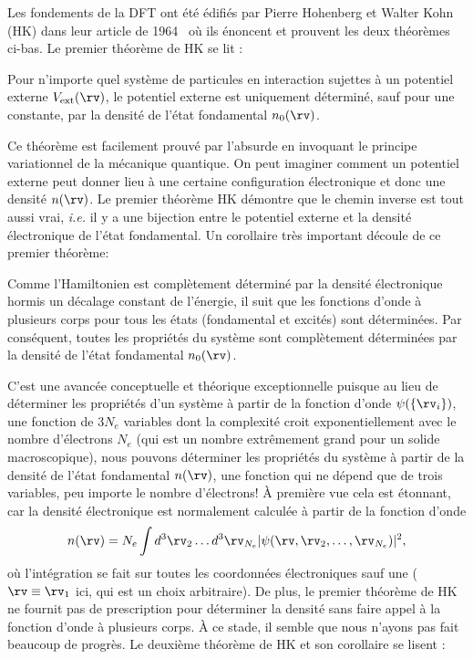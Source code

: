 Les fondements de la DFT ont été édifiés par Pierre Hohenberg et Walter Kohn (HK) dans leur article de 1964~\cite{hohenbergInhomogeneousElectronGas1964} où ils énoncent et prouvent les deux théorèmes ci-bas. Le premier théorème de HK se lit : 
\begin{theo}
    \label{thm:hk1}
    Pour n'importe quel système de particules en interaction sujettes à un potentiel externe $V_\text{ext}(\rv)$, le potentiel externe est uniquement déterminé, sauf pour une constante, par la densité de l'état fondamental $n_0(\rv)$.
\end{theo}
\noindent
Ce théorème est facilement prouvé par l'absurde en invoquant le principe variationnel de la mécanique quantique. On peut imaginer comment un potentiel externe peut donner lieu à une certaine configuration électronique et donc une densité $n(\rv)$. Le premier théorème HK démontre que le chemin inverse est tout aussi vrai, \textit{i.e.} il y a une bijection entre le potentiel externe et la densité électronique de l'état fondamental. Un corollaire très important découle de ce premier théorème:
\begin{cor}
    \label{cor:hk1}
    Comme l'Hamiltonien est complètement déterminé par la densité électronique hormis un décalage constant de l'énergie, il suit que les fonctions d'onde à plusieurs corps pour tous les états (fondamental et excités) sont déterminées. Par conséquent, toutes les propriétés du système sont complètement déterminées par la densité de l'état fondamental $n_0(\rv)$.
\end{cor}
\noindent
C'est une avancée conceptuelle et théorique exceptionnelle puisque au lieu de déterminer les propriétés d'un système à partir de la fonction d'onde $\psi(\{\rv_i\})$, une fonction de $3N_e$ variables dont la complexité croit exponentiellement avec le nombre d'électrons $N_e$ (qui est un nombre extrêmement grand pour un solide macroscopique), nous pouvons déterminer les propriétés du système à partir de la densité de l'état fondamental $n(\rv)$, une fonction qui ne dépend que de trois variables, peu importe le nombre d'électrons! À première vue cela est étonnant, car la densité électronique est normalement calculée à partir de la fonction d'onde
\begin{equation}
    n(\rv)=N_e\int d^3\rv_2\dots d^3\rv_{N_e}|\psi(\rv,\rv_2,\dots,\rv_{N_e})|^2,
\end{equation}
où l'intégration se fait sur toutes les coordonnées électroniques sauf une ($\rv\equiv\rv_1$ ici, qui est un choix arbitraire). De plus, le premier théorème de HK ne fournit pas de prescription pour déterminer la densité sans faire appel à la fonction d'onde à plusieurs corps. À ce stade, il semble que nous n'ayons pas fait beaucoup de progrès. Le deuxième théorème de HK et son corollaire se lisent : 
